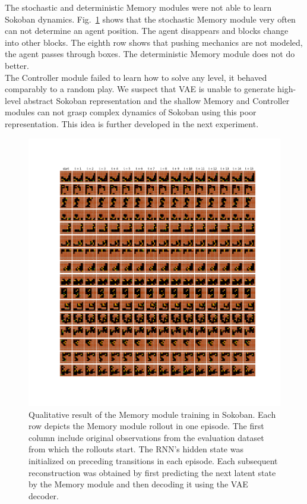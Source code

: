 The stochastic and deterministic Memory modules were not able to learn Sokoban dynamics. Fig.~\ref{Fig.WM_Sokoban_memory} shows that the stochastic Memory module very often can not determine an agent position. The agent disappears and blocks change into other blocks. The eighth row shows that pushing mechanics are not modeled, the agent passes through boxes. The deterministic Memory module does not do better. \\
The Controller module failed to learn how to solve any level, it behaved comparably to a random play. We suspect that VAE is unable to generate high-level abstract Sokoban representation and the shallow Memory and Controller modules can not grasp complex dynamics of Sokoban using this poor representation. This idea is further developed in the next experiment.

\begin{figure}[H]
\includegraphics[width=1\textwidth,keepaspectratio]{figures/Sokoban_memory.png}
\caption[Qualitative result of the World Models' Memory module training in Sokoban]{Qualitative result of the Memory module training in Sokoban. Each row depicts the Memory module rollout in one episode. The first column include original observations from the evaluation dataset from which the rollouts start. The RNN's hidden state was initialized on preceding transitions in each episode. Each subsequent reconstruction was obtained by first predicting the next latent state by the Memory module and then decoding it using the VAE decoder.}
\label{Fig.WM_Sokoban_memory}
\end{figure}


